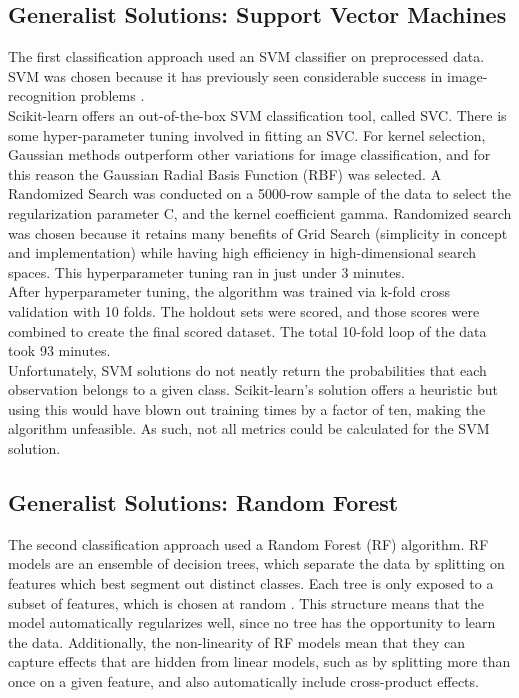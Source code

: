 \documentclass[12pt]{article}
\begin{document}
\subsection{Generalist Solutions: Support Vector Machines}
The first classification approach used an SVM classifier on preprocessed data. SVM was chosen because it has previously seen considerable success in image-recognition problems \citep{svmkernels}.\\

Scikit-learn offers an out-of-the-box SVM classification tool, called SVC. There is some hyper-parameter tuning involved in fitting an SVC. For kernel selection, Gaussian methods outperform other variations for image classification\citep{svmkernels}, and for this reason the Gaussian Radial Basis Function (RBF) was selected. A Randomized Search was conducted on a 5000-row sample of the data to select the regularization parameter C, and the kernel coefficient gamma. Randomized search was chosen because it retains many benefits of Grid Search (simplicity in concept and implementation) while having high efficiency in high-dimensional search spaces. This hyperparameter tuning ran in just under 3 minutes.\\

After hyperparameter tuning, the algorithm was trained via k-fold cross validation with 10 folds. The holdout sets were scored, and those scores were combined to create the final scored dataset. The total 10-fold loop of the data took 93 minutes.\\

Unfortunately, SVM solutions do not neatly return the probabilities that each observation belongs to a given class. Scikit-learn's solution offers a heuristic but using this would have blown out training times by a factor of ten, making the algorithm unfeasible. As such, not all metrics could be calculated for the SVM solution.\\


\subsection{Generalist Solutions: Random Forest}
The second classification approach used a Random Forest (RF) algorithm. RF models are an ensemble of decision trees, which separate the data by splitting on features which best segment out distinct classes. Each tree is only exposed to a subset of features, which is chosen at random \citep{rfimages}. This structure means that the model automatically regularizes well, since no tree has the opportunity to learn the data. Additionally, the non-linearity of RF models mean that they can capture effects that are hidden from linear models, such as by splitting more than once on a given feature, and also automatically include cross-product effects. \\
\end{document}
